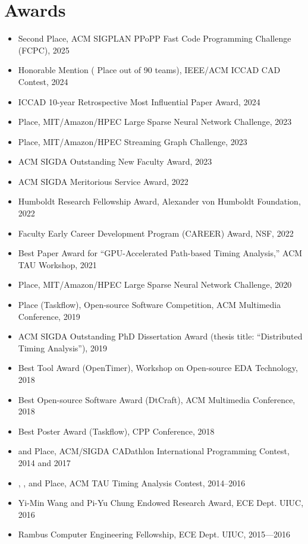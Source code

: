 \documentclass[A4,11pt]{article}
\begin{document}
\section{Awards}
 \begin{itemize}
 \itemsep-3pt
    \item Second Place, ACM SIGPLAN PPoPP Fast Code Programming Challenge (FCPC), 2025
    \item Honorable Mention ( Place out of 90 teams), IEEE/ACM ICCAD CAD Contest, 2024
    \item ICCAD 10-year Retrospective Most Influential Paper Award, 2024
    \item {} Place, MIT/Amazon/HPEC Large Sparse Neural Network Challenge, 2023
    \item {} Place, MIT/Amazon/HPEC Streaming Graph Challenge, 2023
    \item ACM SIGDA Outstanding New Faculty Award, 2023
    \item ACM SIGDA Meritorious Service Award, 2022
    \item Humboldt Research Fellowship Award, Alexander von Humboldt Foundation, 2022
    \item Faculty Early Career Development Program (CAREER) Award, NSF, 2022
    \item Best Paper Award for ``GPU-Accelerated Path-based Timing Analysis,'' ACM TAU Workshop, 2021
    \item {} Place, MIT/Amazon/HPEC Large Sparse Neural Network Challenge, 2020
    \item {} Place (Taskflow), Open-source Software Competition, ACM Multimedia Conference, 2019
    \item ACM SIGDA Outstanding PhD Dissertation Award (thesis title: ``Distributed Timing Analysis''), 2019
    \item Best Tool Award (OpenTimer), Workshop on Open-source EDA Technology, 2018
    \item Best Open-source Software Award (DtCraft), ACM Multimedia Conference, 2018
    \item Best Poster Award (Taskflow), CPP Conference, 2018
    \item {} and  Place, ACM/SIGDA CADathlon International Programming Contest, 2014 and 2017
    \item {}, , and  Place, ACM TAU Timing Analysis Contest, 2014--2016
    \item Yi-Min Wang and Pi-Yu Chung Endowed Research Award, ECE Dept. UIUC, 2016
    \item Rambus Computer Engineering Fellowship, ECE Dept. UIUC, 2015—2016

\end{itemize}
\end{document}
